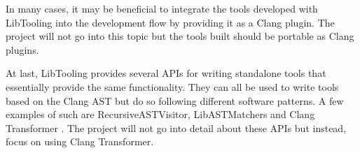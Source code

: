 In many cases, it may be beneficial to integrate the tools developed with LibTooling into the development flow by providing it as a Clang plugin. The project will not go into this topic but the tools built should be portable as Clang plugins.

At last, LibTooling provides several APIs for writing standalone tools that essentially provide the same functionality. They can all be used to write tools based on the Clang AST but do so following different software patterns. A few examples of such are RecursiveASTVisitor, LibASTMatchers and Clang Transformer \cite{HowWriteRecursiveASTVisitor,llvmWelcomeClangDocumentation}. The project will not go into detail about these APIs but instead, focus on using Clang Transformer.